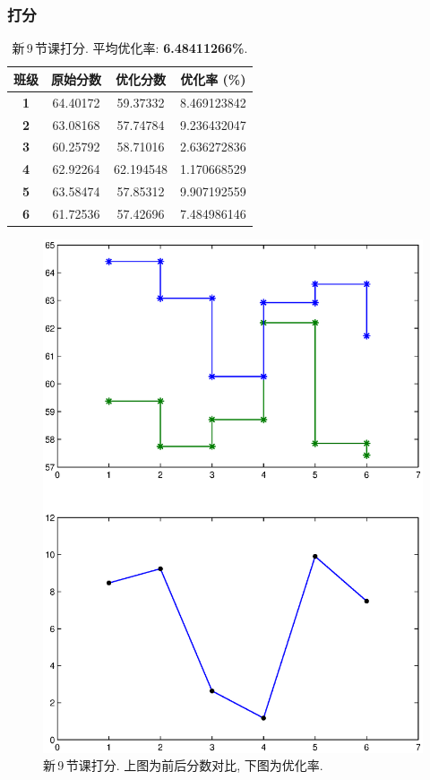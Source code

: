 \documentclass[a4paper]{article}
\begin{document}
  \subsubsection{打分}
   \begin{table}[H]
   \centering
   \begin{tabular}{|c|c|c|c|}
   \hline
   \bf 班级 & \bf 原始分数 & \bf 优化分数 & \bf 优化率 (\%) \\\hline
   \bf 1 & 64.40172 & 59.37332 & 8.469123842 \\\hline
   \bf 2 & 63.08168 & 57.74784 & 9.236432047 \\\hline
   \bf 3 & 60.25792 & 58.71016 & 2.636272836 \\\hline
   \bf 4 & 62.92264 & 62.194548 & 1.170668529 \\\hline
   \bf 5 & 63.58474 & 57.85312 & 9.907192559 \\\hline
   \bf 6 & 61.72536 & 57.42696 & 7.484986146 \\\hline
   \end{tabular}
   \caption{新\,9\,节课打分. 平均优化率: \textbf{6.48411266\%}.}
   \end{table}
   \begin{figure}[H]
   \centerline{\includegraphics[scale=0.5]{new9lessons.eps}}
   \caption{新\,9\,节课打分. 上图为前后分数对比, 下图为优化率.}
   \end{figure}
\clearpage
\end{document}
